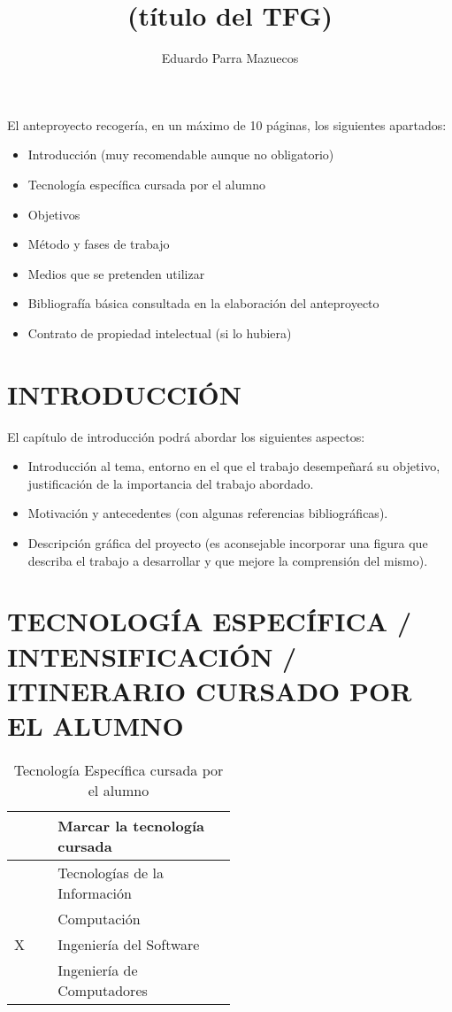 \documentclass{pre-tfg}
\title{(título del TFG)}
\author{Eduardo Parra Mazuecos}
\begin{document}
\maketitle
\tableofcontents

\newpage

El anteproyecto recogería, en un \textcolor[rgb]{0.5,0.0,0.0}{máximo de 10 páginas},
los siguientes apartados:

\begin{itemize}
\item Introducción (muy recomendable aunque no obligatorio)
\item Tecnología específica cursada por el alumno
\item Objetivos
\item Método y fases de trabajo
\item Medios que se pretenden utilizar
\item Bibliografía básica consultada en la elaboración del anteproyecto
\item Contrato de propiedad intelectual (si lo hubiera)
\end{itemize}


\section{INTRODUCCIÓN}

El capítulo de introducción podrá abordar los siguientes aspectos:

\begin{itemize}
\item Introducción al tema, entorno en el que el trabajo desempeñará
  su objetivo, justificación de la importancia del trabajo abordado.
\item Motivación y antecedentes (con algunas referencias bibliográficas).
\item Descripción gráfica del proyecto (es aconsejable incorporar una figura que describa
  el trabajo a desarrollar y que mejore la comprensión del mismo).
\end{itemize}


\section{TECNOLOGÍA ESPECÍFICA / INTENSIFICACIÓN / ITINERARIO CURSADO POR EL ALUMNO}


\begin{table}[hp]
  \centering
  \caption{Tecnología Específica cursada por el alumno}
  \label{tab:tec-especifica}

  \begin{tabular}{p{0.1\linewidth}p{0.4\linewidth}}
     & \textbf{Marcar la tecnología cursada} \\
    \hline
    & Tecnologías de la Información \\
    & Computación \\
    X & Ingeniería del Software \\
    & Ingeniería de Computadores \\
    \hline
  \end{tabular}
\end{table}
\end{document}
